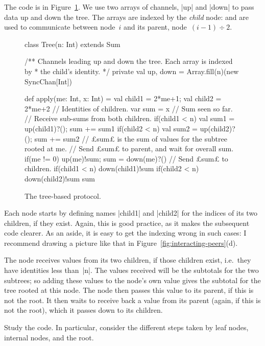 The code is in Figure~\ref{fig:sum-tree}.  We use two arrays of channels, |up|
and |down| to pass data up and down the tree.  The arrays are indexed by the
\emph{child} node:  and  are used to communicate
between node~$i$ and its parent, node~$(i-1) \div 2$.


\begin{figure}
\begin{scala}
class Tree(n: Int) extends Sum{
  /** Channels leading up and down the tree.  Each array is indexed by
    * the child's identity. */
  private val up, down = Array.fill(n)(new SyncChan[Int])
  
  def apply(me: Int, x: Int) = {
    val child1 = 2*me+1; val child2 = 2*me+2  // Identities of children.
    var sum = x                                     // Sum seen so far.
    // Receive sub-sums from both children.
    if(child1 < n){ val sum1 = up(child1)?(); sum += sum1 }
    if(child2 < n){ val sum2 = up(child2)?(); sum += sum2 }
    // £sum£ is the sum of values for the subtree rooted at me.
    // Send £sum£ to parent, and wait for overall sum.
    if(me != 0){ up(me)!sum; sum = down(me)?() }
    // Send £sum£ to children.
    if(child1 < n) down(child1)!sum
    if(child2 < n) down(child2)!sum
    sum
  }
}
\end{scala}
\caption{The tree-based protocol.}
\label{fig:sum-tree}
\end{figure}


Each node starts by defining names |child1| and |child2| for the indices of
its two children, if they exist.  Again, this is good practice, as it makes
the subsequent code clearer.  As an aside, it is easy to get the indexing
wrong in such cases: I recommend drawing a picture like that in
Figure~\ref{fig:interacting-peers}(d).  

The node receives values from its two
children, if those children exist, i.e.~they have identities less than~|n|.
The values received will be the subtotals for the two subtrees; so adding
these values to the node's own value gives the subtotal for the tree rooted at
this node.  The node then passes this value to its parent, if this is not the
root.  It then waits to receive back a value from its parent (again, if this
is not the root), which it passes down to its children.

\begin{instruction}
Study the code.  In particular, consider the different steps taken by leaf
nodes, internal nodes, and the root.
\end{instruction}

